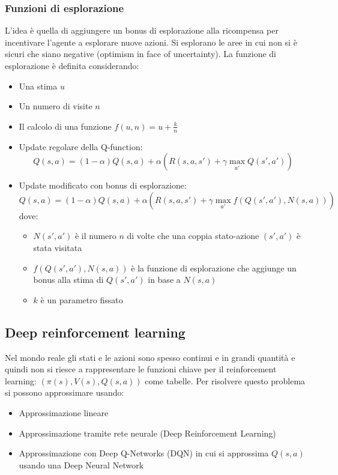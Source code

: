 \documentclass[a4paper]{article}
\begin{document}
\subsubsection{Funzioni di esplorazione}
L'idea è quella di aggiungere un bonus di esplorazione alla ricompensa
per incentivare l'agente a esplorare nuove azioni. Si esplorano le aree in cui non
si è sicuri che siano negative (optimism in face of uncertainty). La funzione di esplorazione
è definita considerando:
\begin{itemize}
  \item Una stima \( u \)
  \item Un numero di visite \( n \)
  \item Il calcolo di una funzione \( f(u, n) = u + \frac{k}{n} \)
\end{itemize}
\begin{itemize}
  \item Update regolare della Q-function:
    \[
      Q(s,a) = (1 - \alpha) Q(s,a) + \alpha (R(s, a, s') + \gamma \max_{a'} Q(s', a'))
    \]

  \item Update modificato con bonus di esplorazione:
    \[
      Q(s,a) = (1 - \alpha) Q(s,a) + \alpha (R(s, a, s') + \gamma \max_{a'} f(Q(s', a'), N(s, a)))
    \]
    dove:
    \begin{itemize}
      \item \( N(s', a') \) è il numero \( n \) di volte che una coppia stato-azione
        \( (s', a') \) è stata visitata
      \item \( f(Q(s', a'), N(s, a)) \) è la funzione di esplorazione che aggiunge
        un bonus alla stima di \( Q(s', a') \) in base a \( N(s, a) \)
      \item \( k \) è un parametro fissato
    \end{itemize}
\end{itemize}

\subsection{Deep reinforcement learning}
Nel mondo reale gli stati e le azioni sono spesso continui e in grandi quantità e
quindi non si riesce a rappresentare le funzioni chiave per il reinforcement learning:
\( (\pi(s), V(s), Q(s,a)) \) come tabelle. Per risolvere questo problema si possono
approssimare usando:
\begin{itemize}
  \item Approssimazione lineare
  \item Approssimazione tramite rete neurale (Deep Reinforcement Learning)
  \item Approssimazione con Deep Q-Networks (DQN) in cui si approssima \( Q(s,a) \)
    usando una Deep Neural Network
\end{itemize}
\end{document}
